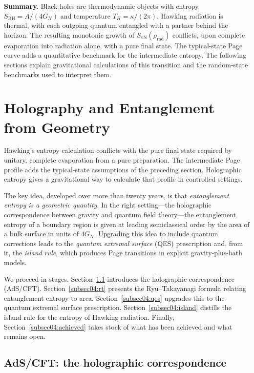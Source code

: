 \documentclass[11pt,letterpaper]{article}
\theoremstyle{plain}
\theoremstyle{definition}
\theoremstyle{remark}
\begin{document}
\bigskip
\noindent\textbf{Summary.}  Black holes are thermodynamic objects
with entropy $S_{\mathrm{BH}} = A/(4G_{N})$ and temperature
$T_{H} = \kappa/(2\pi)$.  Hawking radiation is thermal, with each
outgoing quantum entangled with a partner behind the horizon.  The
resulting monotonic growth of $S_{\mathrm{vN}}(\rho_{\mathrm{rad}})$
conflicts, upon complete evaporation into radiation alone, with a pure
final state. The typical-state Page curve adds a quantitative benchmark
for the intermediate entropy.
The following sections explain gravitational calculations of this
transition and the random-state benchmarks used to interpret them.


\section{Holography and Entanglement from Geometry}
\label{sec04:holography}

Hawking's entropy calculation conflicts with the pure final state required
by unitary, complete evaporation from a pure preparation. The intermediate
Page profile adds the typical-state assumptions of the preceding section.
Holographic entropy gives a gravitational way to calculate that profile in
controlled settings.

The key idea, developed over more than twenty years, is that
\emph{entanglement entropy is a geometric quantity}.  In the right
setting---the holographic correspondence between gravity and quantum
field theory---the entanglement entropy of a boundary region is
given at leading semiclassical order by the area of a bulk surface in
units of $4G_N$.  Upgrading
this idea to include quantum corrections leads to the \emph{quantum
extremal surface} (QES) prescription and, from it, the
\emph{island rule}, which produces Page transitions in explicit
gravity-plus-bath models.

We proceed in stages.  Section~\ref{subsec04:adscft} introduces
the holographic correspondence (AdS/CFT).
Section~\ref{subsec04:rt} presents the Ryu--Takayanagi formula
relating entanglement entropy to area.
Section~\ref{subsec04:qes} upgrades this to the quantum extremal
surface prescription.  Section~\ref{subsec04:island} distills
the island rule for the entropy of Hawking radiation.  Finally,
Section~\ref{subsec04:achieved} takes stock of what has been
achieved and what remains open.


\subsection{AdS/CFT: the holographic correspondence}
\label{subsec04:adscft}
\end{document}
